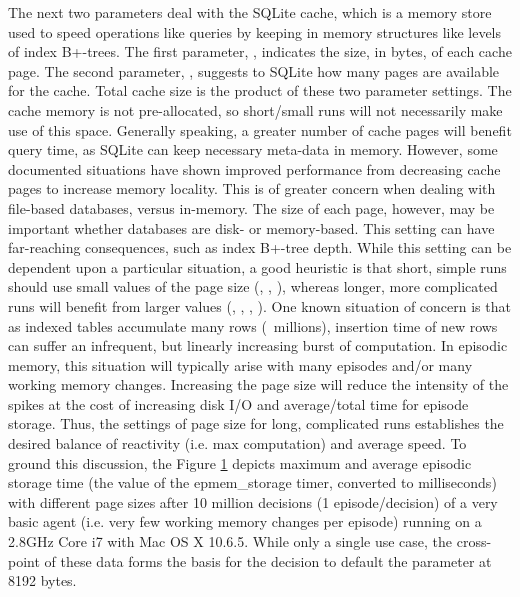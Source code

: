 The next two parameters deal with the SQLite cache, which is a memory store used to speed operations like queries by keeping in memory structures like levels of index B+-trees. 
The first parameter, , indicates the size, in bytes, of each cache page. 
The second parameter, , suggests to SQLite how many pages are available for the cache. 
Total cache size is the product of these two parameter settings. 
The cache memory is not pre-allocated, so short/small runs will not necessarily make use of this space. 
Generally speaking, a greater number of cache pages will benefit query time, as SQLite can keep necessary meta-data in memory. 
However, some documented situations have shown improved performance from decreasing cache pages to increase memory locality. 
This is of greater concern when dealing with file-based databases, versus in-memory. 
The size of each page, however, may be important whether databases are disk- or memory-based. 
This setting can have far-reaching consequences, such as index B+-tree depth. 
While this setting can be dependent upon a particular situation, a good heuristic is that short, simple runs should use small values of the page size (, , ), whereas longer, more complicated runs will benefit from larger values (, , , ). 
One known situation of concern is that as indexed tables accumulate many rows (~millions), insertion time of new rows can suffer an infrequent, but linearly increasing burst of computation. 
In episodic memory, this situation will typically arise with many episodes and/or many working memory changes. 
Increasing the page size will reduce the intensity of the spikes at the cost of increasing disk I/O and average/total time for episode storage. 
Thus, the settings of page size for long, complicated runs establishes the desired balance of reactivity (i.e. max computation) and average speed. 
To ground this discussion, the Figure \ref{fig:epmem-cache} depicts maximum and average episodic storage time (the value of the epmem\_storage timer, converted to milliseconds) with different page sizes after 10 million decisions (1 episode/decision) of a very basic agent (i.e. very few working memory changes per episode) running on a 2.8GHz Core i7 with Mac OS X 10.6.5. 
While only a single use case, the cross-point of these data forms the basis for the decision to default the parameter at 8192 bytes.

\begin{figure}
\label{fig:epmem-cache}
\end{figure}

